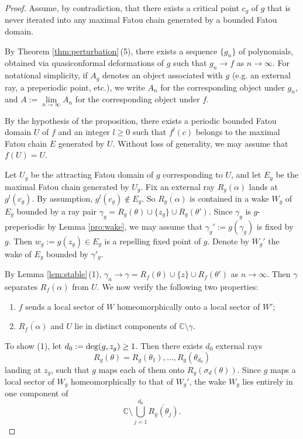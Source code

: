 \documentclass[a4paper,reqno,times, 11pt]{amsart}
\theoremstyle{remark}
\theoremstyle{plain}
\numberwithin{equation}{section}
\def\g{\gamma}
\def\C{\mbox{$\mathbb C$}}
\begin{document}
\begin{proof}
	Assume, by contradiction, that there exists a critical point
	$c_g$ of $g$ that is never iterated into any maximal Fatou chain generated by a bounded Fatou domain.
	
	By Theorem \ref{thm:perturbation}\,(5), there exists a sequence $\{g_n\}$ of polynomials, obtained via quasiconformal deformations of $g$ such that $g_n\to f$ as $n\to\infty$.
	For notational simplicity, if $A_g$ denotes an object associated with $g$ (e.g. an external ray, a preperiodic point, etc.), we write $A_n$ for the corresponding object under $g_n$, and $A:=\lim\limits_{n\to\infty} A_n$ for the corresponding object under $f$.
	
	By the hypothesis of the proposition, there exists a periodic bounded Fatou domain $ U$ of $f$ and an integer $l\geq0$ such that $f^l(c)$ belongs to the maximal Fatou chain $E$ generated by $ U$. Without loss of generality, we may assume that $f( U)= U$.
	
	Let $ U_g$ be the attracting Fatou domain of $g$ corresponding to $ U$, and let $E_g$ be the maximal Fatou chain generated by $ U_g$. Fix an external ray $R_g(\alpha)$ lands at $g^l(c_g)$. By assumption, $g^l(c_g)\notin E_g$. So  $\overline{R_g(\alpha)}$ is contained in a wake $W_g$ of $E_g$ bounded by a ray pair $\g_g=R_g(\theta)\cup \{z_g\}\cup R_g(\theta')$. Since $\g_g$ is $g$-preperiodic by Lemma \ref{pro:wake}, we may assume that
	$\g_g':=g(\g_g)$ is fixed by $g$. Then $w_g:=g(z_g)\in E_g$ is a repelling fixed point of $g$. Denote by $W_g'$ the wake of $E_g$ bounded by $\g'_g$. %
	
	
	By Lemma \ref{lem:stable}\,(1), $\g_n\to \g=R_f(\theta)\cup\{z\}\cup R_f(\theta')$ as $n\to\infty$. Then $\g$ separates $R_f(\alpha)$ from $ U$. We now verify the following two properties:
	\begin{enumerate}
		\item $f$ sends a local sector of $W$ homeomorphically onto a local sector of $W'$;
		\item $\overline{R_f(\alpha)}$ and $ U$ lie in distinct components of $\mathbb{C}\setminus\g.$
	\end{enumerate}
	
	To show (1), let $d_0:={\rm deg}(g, z_g)\geq 1$. Then there exists $d_0$ external rays $$R_g(\theta)=R_g(\theta_1),\ldots, R_g(\theta_{d_0})$$
	landing at $ z_g$, such that $g$ maps each of them onto $R_g(\sigma_d(\theta))$. Since $g$ maps a local sector of $W_g$ homeomorphically to that of $W_g'$, the wake $W_g$ lies entirely in one component of $$\C\setminus\bigcup_{j=1}^{d_0}\overline{R_g(\theta_j)}.$$
	

\end{proof}
\end{document}

